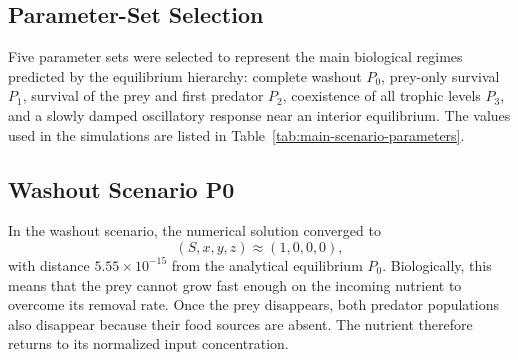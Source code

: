 \subsection{Parameter-Set Selection}

Five parameter sets were selected to represent the main biological regimes
predicted by the equilibrium hierarchy: complete washout \(P_0\), prey-only
survival \(P_1\), survival of the prey and first predator \(P_2\), coexistence
of all trophic levels \(P_3\), and a slowly damped oscillatory response near
an interior equilibrium. The values used in the simulations are listed in
Table~\ref{tab:main-scenario-parameters}.

\begin{table}[htbp]
\centering
\caption{Parameter sets used in the main simulation experiments.}
\label{tab:main-scenario-parameters}
\end{table}

\subsection{Washout Scenario P0}

In the washout scenario, the numerical solution converged to
\[
(S,x,y,z)\approx(1,0,0,0),
\]
with distance \(5.55\times 10^{-15}\) from the analytical equilibrium \(P_0\).
Biologically, this means that the prey cannot grow fast enough on the incoming
nutrient to overcome its removal rate. Once the prey disappears, both predator
populations also disappear because their food sources are absent. The nutrient
therefore returns to its normalized input concentration.

